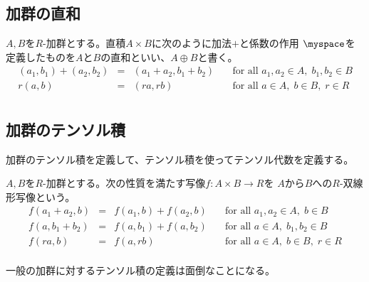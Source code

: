 {\subsection{加群の直和}\label{s2:加群の直和} %
	\begin{definition}[加群の直和]\label{def:加群の直和} %
		$A,B$を$R$-加群とする。直積$A\times B$に次のように加法$+$と係数の作用
		$\myspace$を定義したものを$A$と$B$の直和といい、$A\oplus B$と書く。
		\begin{equation*}\begin{array}{rcll}
			(a_1,b_1) + (a_2,b_2) &=& (a_1+a_2,b_1+b_2)
				& \quad\text{for all }a_1,a_2\in A,\; b_1,b_2\in B \\
			r(a,b) &=& (ra,rb)
				& \quad\text{for all }a\in A,\; b\in B,\; r\in R \\
		\end{array}\end{equation*}
	\end{definition} %

\subsection{加群のテンソル積}\label{s2:加群のテンソル積} %
	加群のテンソル積を定義して、テンソル積を使ってテンソル代数を定義する。

	\begin{definition}[双線形写像]\label{def:双線形写像} %
		$A,B$を$R$-加群とする。次の性質を満たす写像$f:A\times B\to R$を
		$A$から$B$への$R$-双線形写像という。
		\begin{equation*}\begin{array}{rcll}
			f(a_1+a_2,b) &=& f(a_1,b) + f(a_2,b)
				& \quad\text{for all }a_1,a_2\in A,\; b\in B \\
			f(a,b_1+b_2) &=& f(a,b_1) + f(a,b_2)
				& \quad\text{for all }a\in A,\; b_1,b_2\in B \\
			f(ra,b) &=& f(a,rb)
				& \quad\text{for all }a\in A,\; b\in B,\; r\in R \\
		\end{array}\end{equation*}
	\end{definition} %

	一般の加群に対するテンソル積の定義は面倒なことになる。

}
